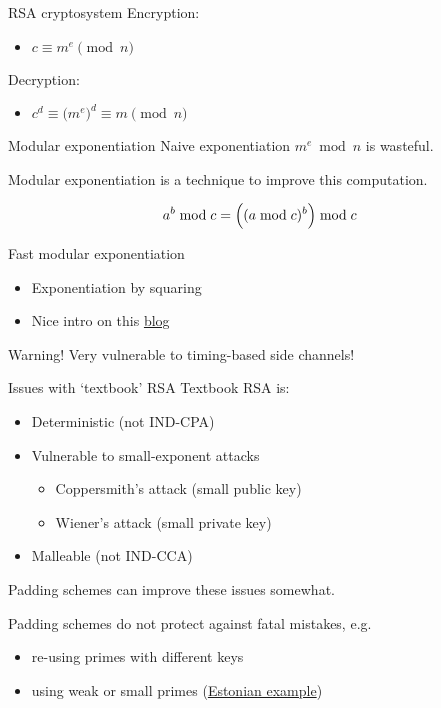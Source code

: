 \begin{frame}{RSA cryptosystem}
  Encryption:
  \pause
  \begin{itemize}
    \item $c \equiv m^e \pmod{n}$
  \end{itemize}

  \pause
  Decryption:
  \pause
  \begin{itemize}
    \item $c^d \equiv \bigl(m^e\bigr)^d \equiv m \pmod{n}$
  \end{itemize}
\end{frame}

\begin{frame}{Modular exponentiation}
  Naive exponentiation $m^e \bmod n$ is wasteful.

  \pause
  Modular exponentiation is a technique to improve this computation.

  \pause
  \[
    a^b \bmod c = \Bigl((a \bmod c)^b\Bigr) \bmod c
  \]

  \pause
  Fast modular exponentiation
  \begin{itemize}[<+(1)->]
    \item Exponentiation by squaring
    \item Nice intro on this \href{https://dev-notes.eu/2019/12/Fast-Modular-Exponentiation/}{blog}
  \end{itemize}

  \pause
  \begin{block}{Warning!}
    Very vulnerable to timing-based side channels!
  \end{block}
  
\end{frame}

\begin{frame}{Issues with `textbook' RSA}
  Textbook RSA is:
  \begin{itemize}[<+(1)->]
    \item Deterministic (not IND-CPA)
    \item Vulnerable to small-exponent attacks
    \begin{itemize}
      \item Coppersmith's attack (small public key)
      \item Wiener's attack (small private key)
    \end{itemize}
    \item Malleable (not IND-CCA)
  \end{itemize}

  \pause
  Padding schemes can improve these issues somewhat.

  \pause
  Padding schemes do not protect against fatal mistakes, e.g.
  \begin{itemize}[<+(1)->]
    \item re-using primes with different keys
    \item using weak or small primes (\href{https://cybersec.ee/2017/10/18/rsa-2048-bit-keys-in-estonian-id-cards-issued-after-october-2014-are-factorizable/}{Estonian example})
  \end{itemize}
\end{frame}


